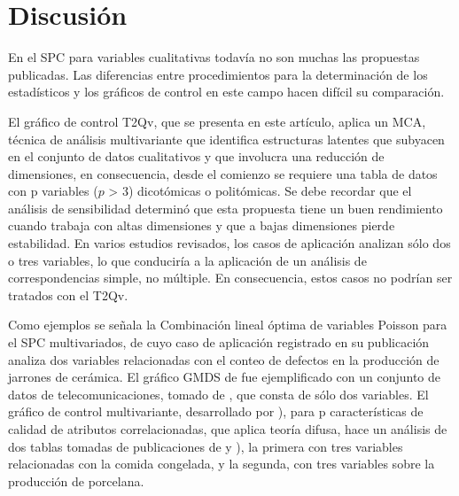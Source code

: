 \documentclass[water,article,submit,moreauthors,pdftex]{mdpi}
\begin{document}
\hypertarget{discusiuxf3n}{%
\section{Discusión}\label{discusiuxf3n}}

En el SPC para variables cualitativas todavía no son muchas las
propuestas publicadas. Las diferencias entre procedimientos para la
determinación de los estadísticos y los gráficos de control en este
campo hacen difícil su comparación.

El gráfico de control T2Qv, que se presenta en este artículo, aplica un
MCA, técnica de análisis multivariante que identifica estructuras
latentes que subyacen en el conjunto de datos cualitativos y que
involucra una reducción de dimensiones, en consecuencia, desde el
comienzo se requiere una tabla de datos con p variables (\(p\)
\textgreater{} 3) dicotómicas o politómicas. Se debe recordar que el
análisis de sensibilidad determinó que esta propuesta tiene un buen
rendimiento cuando trabaja con altas dimensiones y que a bajas
dimensiones pierde estabilidad. En varios estudios revisados, los casos
de aplicación analizan sólo dos o tres variables, lo que conduciría a la
aplicación de un análisis de correspondencias simple, no múltiple. En
consecuencia, estos casos no podrían ser tratados con el T2Qv.

Como ejemplos se señala la Combinación lineal óptima de variables
Poisson para el SPC multivariados, de \citet{epprecht2013optimal} cuyo
caso de aplicación registrado en su publicación analiza dos variables
relacionadas con el conteo de defectos en la producción de jarrones de
cerámica. El gráfico GMDS de \citet{raza2019design} fue ejemplificado
con un conjunto de datos de telecomunicaciones, tomado de
\citet{jiang2002process}, que consta de sólo dos variables. El gráfico
de control multivariante, desarrollado por
\citet{pastuizaca2015multivariate} ), para p características de calidad
de atributos correlacionadas, que aplica teoría difusa, hace un análisis
de dos tablas tomadas de publicaciones de \citet{taleb2009control} y
\citet{taleb2006multivariate}), la primera con tres variables
relacionadas con la comida congelada, y la segunda, con tres variables
sobre la producción de porcelana.
\end{document}
